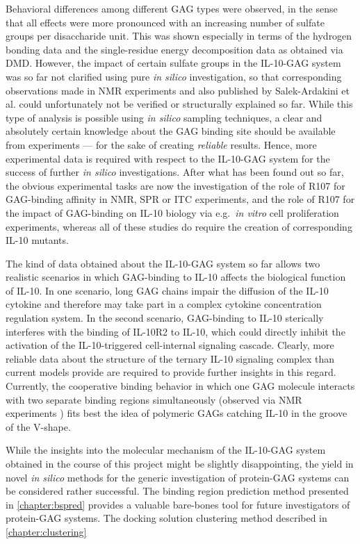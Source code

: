 Behavioral differences among different GAG types were observed, in the sense
that all effects were more pronounced with an increasing number of sulfate
groups per disaccharide unit. This was shown especially in terms of the hydrogen
bonding data and the single-residue energy decomposition data as obtained via
DMD. However, the impact of certain sulfate groups in the IL-10-GAG system was
so far not clarified using pure \textit{in silico} investigation, so that
corresponding observations made in NMR experiments and also published by
Salek-Ardakini et al. \cite{salek_ardakani_2000} could unfortunately not be
verified or structurally explained so far. While this type of analysis is
possible using \textit{in silico} sampling techniques, a clear and absolutely
certain knowledge about the GAG binding site should be available from
experiments --- for the sake of creating \textit{reliable} results. Hence, more
experimental data is required with respect to the IL-10-GAG system for the
success of further \textit{in silico} investigations. After what has been found
out so far, the obvious experimental tasks are now the investigation of the role
of R107 for GAG-binding affinity in NMR, SPR or ITC experiments, and the role of
R107 for the impact of GAG-binding on IL-10 biology via e.g.\ \textit{in vitro}
cell proliferation experiments, whereas all of these studies do require the
creation of corresponding IL-10 mutants.

The kind of data obtained about the IL-10-GAG system so far allows two realistic
scenarios in which GAG-binding to IL-10 affects the biological function of
IL-10. In one scenario, long GAG chains impair the diffusion of the IL-10
cytokine and therefore may take part in a complex cytokine concentration
regulation system. In the second scenario, GAG-binding to IL-10 sterically
interferes with the binding of IL-10R2 to IL-10, which could directly inhibit
the activation of the IL-10-triggered cell-internal signaling cascade. Clearly,
more reliable data about the structure of the ternary IL-10 signaling complex
than current models provide are required to provide further insights in this
regard. Currently, the cooperative binding behavior in which one GAG molecule
interacts with two separate binding regions simultaneously (observed via NMR
experiments \cite{kuenze_gehrcke_2014}) fits best the idea of polymeric GAGs
catching IL-10 in the groove of the V-shape.

While the insights into the molecular mechanism of the IL-10-GAG system obtained
in the course of this project might be slightly disappointing, the yield in
novel \textit{in silico} methods for the generic investigation of protein-GAG
systems can be considered rather successful. The binding region prediction
method presented in \cref{chapter:bspred} provides a valuable bare-bones tool
for future investigators of protein-GAG systems. The docking solution
clustering method described in \cref{chapter:clustering}

